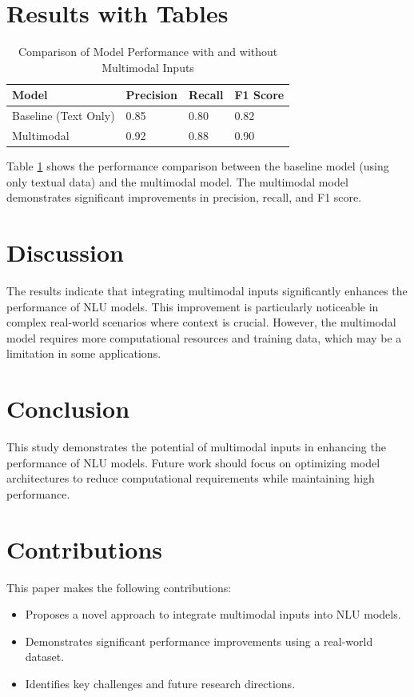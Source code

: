 \documentclass{article}
\begin{document}
\section{Results with Tables}
\begin{table}[ht]
\centering
\caption{Comparison of Model Performance with and without Multimodal Inputs}
\begin{tabular}{@{}llll@{}}
\toprule
Model & Precision & Recall & F1 Score \\ \midrule
Baseline (Text Only) & 0.85 & 0.80 & 0.82 \\
Multimodal & 0.92 & 0.88 & 0.90 \\ \bottomrule
\end{tabular}
\label{tab:results}
\end{table}

Table \ref{tab:results} shows the performance comparison between the baseline model (using only textual data) and the multimodal model. The multimodal model demonstrates significant improvements in precision, recall, and F1 score.

\section{Discussion}
The results indicate that integrating multimodal inputs significantly enhances the performance of NLU models. This improvement is particularly noticeable in complex real-world scenarios where context is crucial. However, the multimodal model requires more computational resources and training data, which may be a limitation in some applications.

\section{Conclusion}
This study demonstrates the potential of multimodal inputs in enhancing the performance of NLU models. Future work should focus on optimizing model architectures to reduce computational requirements while maintaining high performance.

\section{Contributions}
This paper makes the following contributions:
\begin{itemize}
    \item Proposes a novel approach to integrate multimodal inputs into NLU models.
    \item Demonstrates significant performance improvements using a real-world dataset.
    \item Identifies key challenges and future research directions.
\end{itemize}



\end{document}

